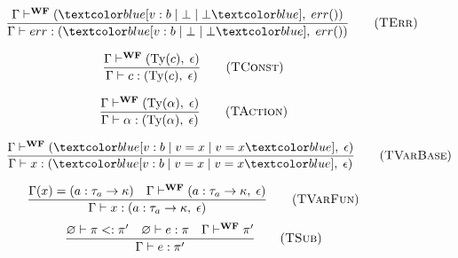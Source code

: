 \begin{figure}[H]
    \begin{multicols}{2}
        \begin{equation}
            \frac{
                \Gamma \vdash^{\textbf{WF}} (\under{v: b \;|\; \bot \;|\; \bot}, \; err())
            }{
                \Gamma \vdash err : (\under{v: b \;|\; \bot \;|\; \bot}, \; err())
            }
            \tag{\textsc{TErr}}
            \label{eq:terr}
        \end{equation}
        
        \columnbreak
    
        \begin{equation}
            \frac{
                \Gamma \vdash^{\textbf{WF}} (\text{Ty}(c), \; \epsilon)
            }{
                \Gamma \vdash c : (\text{Ty}(c), \; \epsilon)
            }
            \tag{\textsc{TConst}}
            \label{eq:tconst}
        \end{equation}
    \end{multicols}

    \begin{multicols}{2}
        \begin{equation}
            \frac{
                \Gamma \vdash^{\textbf{WF}} (\text{Ty}(\alpha), \; \epsilon)
            }{
                \Gamma \vdash \alpha : (\text{Ty}(\alpha), \; \epsilon)
            }
            \tag{\textsc{TAction}}
            \label{eq:taction}
        \end{equation}

        \columnbreak

        \begin{equation}
            \frac{
                \Gamma \vdash^{\textbf{WF}} (\under{v: b \;|\; v = x \;|\; v = x}, \; \epsilon)
            }{
                \Gamma \vdash x : (\under{v: b \;|\; v = x \;|\; v = x}, \; \epsilon)
            }
            \tag{\textsc{TVarBase}}
            \label{eq:tvarb}
        \end{equation}
    \end{multicols}

    \begin{multicols}{2}
        \noindent
        \begin{equation}
            \frac{
                \Gamma(x) = (a: \tau_a \rightarrow \kappa) \quad \Gamma \vdash^{\textbf{WF}} (a:\tau_a \rightarrow \kappa, \; \epsilon)
            }{
                \Gamma \vdash x : (a:\tau_a \rightarrow \kappa, \; \epsilon)
            }
            \tag{\textsc{TVarFun}}
            \label{eq:tvarf}
        \end{equation}
        \columnbreak
        \begin{equation}
            \frac{
                \varnothing \vdash \pi <: \pi' \quad \varnothing \vdash e : \pi \quad \Gamma \vdash^{\textbf{WF}} \pi'
            }{
                \Gamma \vdash e : \pi'
            }
            \tag{\textsc{TSub}}
            \label{eq:tsub}
        \end{equation}
    \end{multicols}


\end{figure}

